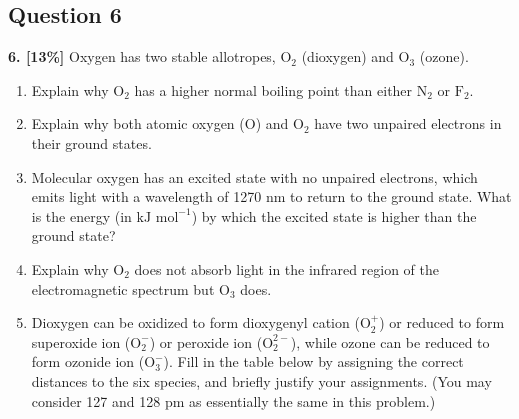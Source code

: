 \documentclass[10pt,a4paper]{article}
\begin{document}
\subsection*{Question 6}
\textbf{6. [13\%]} Oxygen has two stable allotropes, $\text{O}_2$ (dioxygen) and $\text{O}_3$ (ozone).
\begin{enumerate}[label=\alph*.]
    \vspace{5cm} \item Explain why $\text{O}_2$ has a higher normal boiling point than either $\text{N}_2$ or $\text{F}_2$.
    \vspace{5cm} \item Explain why both atomic oxygen (O) and $\text{O}_2$ have two unpaired electrons in their ground states.
    \vspace{5cm} \item Molecular oxygen has an excited state with no unpaired electrons, which emits light with a wavelength of 1270 nm to return to the ground state. What is the energy (in $\text{kJ mol}^{-1}$) by which the excited state is higher than the ground state?
    \vspace{5cm} \item Explain why $\text{O}_2$ does not absorb light in the infrared region of the electromagnetic spectrum but $\text{O}_3$ does.
    \vspace{5cm} \item Dioxygen can be oxidized to form dioxygenyl cation ($\text{O}_2^+$) or reduced to form superoxide ion ($\text{O}_2^-$) or peroxide ion ($\text{O}_2^{2-}$), while ozone can be reduced to form ozonide ion ($\text{O}_3^-$). Fill in the table below by assigning the correct distances to the six species, and briefly justify your assignments. (You may consider 127 and 128 pm as essentially the same in this problem.)
\end{enumerate}
\end{document}
